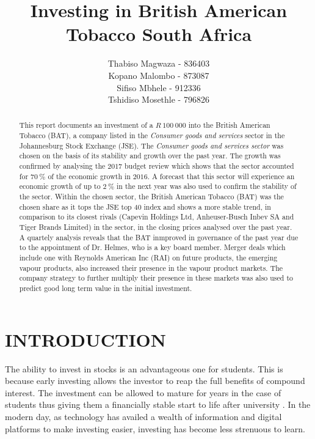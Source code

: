 \documentclass[letterpaper, 10 pt, conference]{ieeeconf}  %
\title{\LARGE \bf
Investing in British American Tobacco South Africa 
}
\author{Thabiso Magwaza - 836403 \\ Kopano Malombo - 873087\\ Sifiso Mbhele - 912336 \\ Tshidiso Mosethle - 796826 }
\begin{document}
\maketitle
\thispagestyle{empty}
\pagestyle{empty}


\begin{abstract}
This report documents an investment of a $R~100~000$ into the British American Tobacco (BAT), a company listed in the \textit{Consumer goods and services} sector in the Johannesburg Stock Exchange (JSE). The \textit{Consumer goods and services sector} was chosen on the basis of its stability and growth over the past year. The growth was confirmed by analysing the $2017$ budget review which shows that the sector accounted for $70~\%$ of the economic growth in $2016$. A forecast that this sector will experience an economic growth of up to $2~\%$ in the next year was also used to confirm the stability of the sector. Within the chosen sector, the British American Tobacco (BAT) was the chosen share as it tops the JSE top 40 index and shows a more stable trend, in comparison to its closest rivals (Capevin Holdings Ltd, Anheuser-Busch Inbev SA and Tiger Brands Limited) in the sector, in the closing prices analysed over the past year. A quartely analysis reveals that the BAT inmproved in governance of the past year due to the appointment of Dr. Helmes, who is a key board member. Merger deals which include one with Reynolds American Inc (RAI) on future products, the emerging vapour products, also increased their presence in the vapour product markets. The company strategy to further multiply their presence in these markets was also used to predict good long term value in the initial investment.
\end{abstract}


\section{INTRODUCTION}

The ability to invest in stocks is an advantageous one for students. This is because early investing allows the investor to reap the full benefits of compound interest. The investment can be allowed to mature for years in the case of students thus giving them a financially stable start to life after university \cite{earlyInvestment}. In the modern day, as technology has availed a wealth of information and digital platforms to make investing easier, investing has become less strenuous to learn. 
\end{document}
